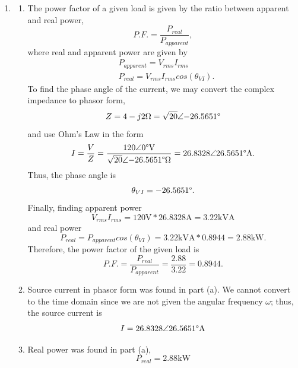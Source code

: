 \documentclass{article}
\begin{document}
\begin{enumerate}
\begin{enumerate}[label=\alph*)]
				Therefore, \[V_{ave} = 0\text{V}.\]

				This is the reason rms values are more commonly used as a measure of the average value of an AC voltage or current.	
			\item Load impedance \(Z\) is given by the sum of the real and imaginary components of impedance, resistance, \(R\), and reactance, \(X\), \[Z = R + jX,\] and can be derived by expressing both voltage and current as phasors (assuming they have the same angular frequency \(\omega\) and using the Ohm's Law relationship \[
			Z = \frac{V}{I} = \frac{340\angle{30\degree\text{V}}}{100\angle{50\degree}\text{A}} = 3.4\angle{-20}\degree\text{\ohm}.
			\]
			The negative phase angle of the impedance implies a capacitive load.
		\end{enumerate}
		\item
			\begin{enumerate}[label=\alph*)]
				\item The power factor of a given load is given by the ratio between apparent and real power, \[
						P.F. = \frac{P_{real}}{P_{apparent}},
				\]
				where real and apparent power are given by 
				\begin{align}
					&P_{apparent} = V_{rms}I_{rms} \\
					&P_{real} = V_{rms}I_{rms}cos(\theta_{VI}).
				\end{align}
				To find the phase angle of the current, we may convert the complex impedance to phasor form, \[
					Z = 4 - j2 \ohm = \sqrt{20}\angle{-26.5651\degree} 
				\]
				and use Ohm's Law in the form \[
					I = \frac{V}{Z} = \frac{120\angle{0\degree}\text{V}}{\sqrt{20}\angle{-26.5651\degree}\ohm} = 26.8328\angle{26.5651\degree}\text{A}.
				\]
				Thus, the phase angle is \[
					\theta_{VI} = -26.5651\degree.
				\]
				Finally, finding apparent power \[
					V_{rms}I_{rms} = 120\text{V} * 26.8328\text{A} = 3.22\text{kVA} 
				\]
				and real power \[
					P_{real} = P_{apparent}cos(\theta_{VI}) = 3.22\text{kVA}*0.8944 = 2.88\text{kW}.
				\]
				Therefore, the power factor of the given load is \[
					P.F. = \frac{P_{real}}{P_{apparent}} = \frac{2.88}{3.22} = 0.8944.
				\]
			\item Source current in phasor form was found in part (a). We cannot convert to the time domain since we are not given the angular frequency \(\omega\); thus, the source current is \[
					I = 26.8328\angle{26.5651\degree}\text{A}
			\]
			\item Real power was found in part (a), \[
					P_{real} = 2.88\text{kW}
\]
\end{enumerate}
\end{enumerate}
\end{document}
